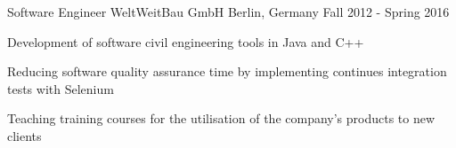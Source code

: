 \begin{cventries}
  \cventry
    {Software Engineer} %
    {WeltWeitBau GmbH} %
    {Berlin, Germany} %
    {Fall 2012 - Spring 2016} %
    {
      \begin{cvitems} %
        \item {Development of software civil engineering tools in Java and C++}
        \item {Reducing software quality assurance time by implementing continues integration tests with Selenium}
        \item {Teaching training courses for the utilisation of the company's products to new clients}
      \end{cvitems}
    }


\end{cventries}
